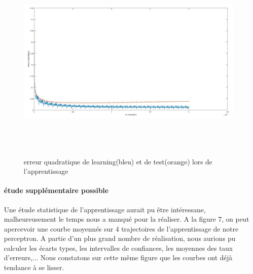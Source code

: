 \documentclass[a4paper,twoside]{report}
\begin{document}
\begin{figure}[!h]
	\begin{center}
		\includegraphics[width=17cm,height=10cm]{Images/courbes3couches50_quaderror.jpg} 
		\caption{erreur quadratique de learning(bleu) et de test(orange) lors de l'apprentissage}  
	\end{center}
\end{figure}

\paragraph{étude supplémentaire possible}

Une étude statistique de l'apprentissage aurait pu être intéressane, malheureusement le temps nous a manqué pour la réaliser. A la figure 7, on peut apercevoir une courbe moyennés sur 4 trajectoires de l'apprentissage de notre perceptron. A partie d'un plus grand nombre de réalisation, nous aurions pu calculer les écarts types, les intervalles de confiances, les moyennes des taux d'erreurs,... Nous constatons sur cette même figure que les courbes ont déjà tendance à se lisser.
\end{document}
